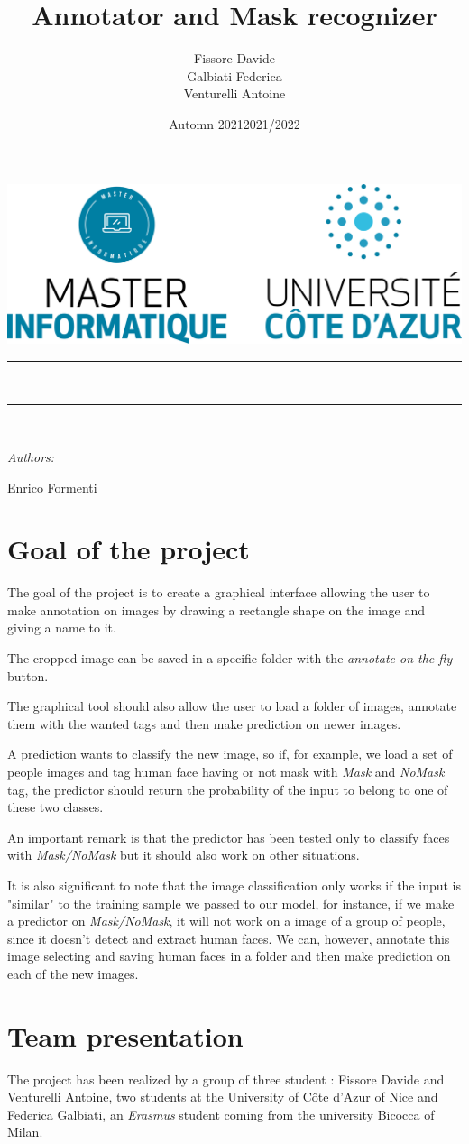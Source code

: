 \documentclass[a4paper,12pt]{article}
\title{Annotator and Mask recognizer}
\author{Fissore Davide\\ Galbiati Federica\\ Venturelli Antoine}
\date{Automn 2021}
\date{2021/2022}
\makeatletter
\newcommand{\supervisorone}{Enrico Formenti}
\def\maketitle{
  \begin{center}\leavevmode
       \normalfont
       \includegraphics[width=0.6\columnwidth]{logo_haut_uca.png}
       \vskip 0.5cm
       \vskip 1.5cm
       \rule{\linewidth}{0.2 mm} 
       {\large \exam}\\[1 cm]
       {\huge \bfseries \@title \par}
       \vspace{1cm}
	\rule{\linewidth}{0.2 mm} \\[1.5 cm]

	\begin{minipage}[t]{0.45\textwidth}
		\begin{flushleft} \large
			\emph{Authors:}\\
			\@author
		\end{flushleft}
	\end{minipage}
	\begin{minipage}[t]{0.45\textwidth}
	    \begin{flushright} \large
			\ifdefempty{\supervisortwo}{\emph{Supervisor:\\}}{\emph{Professor:\\}}
			\supervisorone
		\end{flushright}
	\end{minipage}
	\vfill
	{\Large \@date\par}
   \end{center}
   \cleardoublepage
  }
\makeatother
\begin{document}
  \maketitle

  \tableofcontents

  \clearpage

\section{Goal of the project}
The goal of the project is to create a graphical interface allowing the user to make annotation on images by drawing a rectangle shape on the image and giving a name to it. 

The cropped image can be saved in a specific folder with the \textit{annotate-on-the-fly} button.

The graphical tool should also allow the user to load a folder of images, annotate them with the wanted tags and then make prediction on newer images.

A prediction wants to classify the new image, so if, for example, we load a set of people images and tag human face having or not mask with \textit{Mask} and \textit{NoMask} tag, the predictor should return the probability of the input to belong to one of these two classes.

An important remark is that the predictor has been tested only to classify faces with \textit{Mask/NoMask} but it should also work on other situations. 

It is also significant to note that the image classification only works if the input is "similar" to the training sample we passed to our model, for instance, if we make a predictor on \textit{Mask/NoMask}, it will not work on a image of a group of people, since it doesn't detect and extract human faces. We can, however, annotate this image selecting and saving human faces in a folder and then make prediction on each of the new images.

\section{Team presentation}

The project has been realized by a group of three student : Fissore Davide and Venturelli Antoine, two students at the University of Côte d'Azur of Nice and Federica Galbiati, an \textit{Erasmus} student coming from the university Bicocca of Milan.
\end{document}
